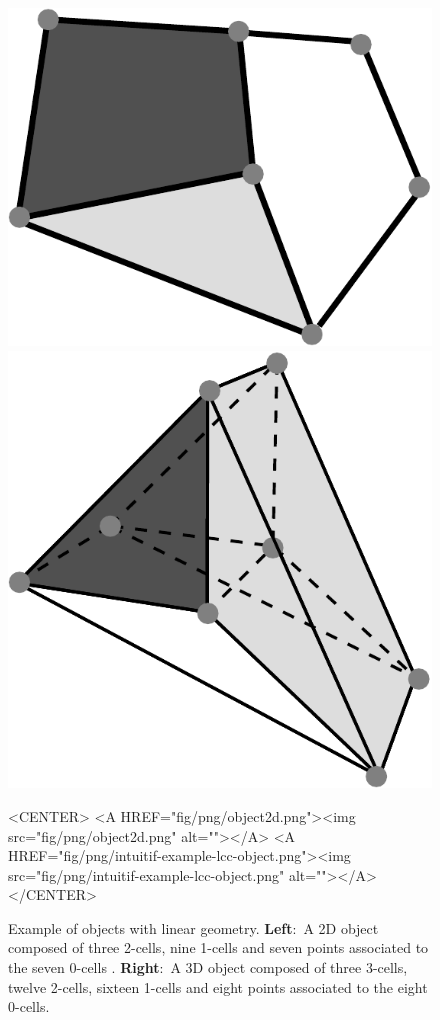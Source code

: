 \begin{figure}[ht]
  \begin{ccTexOnly}
    \begin{center}
      \includegraphics[width=.3\textwidth]
      {Linear_cell_complex/fig/pdf/object2d}
      \qquad
      \includegraphics[width=.53\textwidth]
      {Linear_cell_complex/fig/pdf/intuitif-example-lcc-object}
    \end{center}
  \end{ccTexOnly}
  \begin{ccHtmlOnly}
    <CENTER>
    <A HREF="fig/png/object2d.png"><img src="fig/png/object2d.png" alt=""></A>
    <A HREF="fig/png/intuitif-example-lcc-object.png"><img src="fig/png/intuitif-example-lcc-object.png" alt=""></A>
    </CENTER>
    \end{ccHtmlOnly}
    \caption{Example of objects with linear geometry. \textbf{Left}:~A
      2D object composed of three 2-cells, nine
      1-cells and seven points associated to the seven 0-cells .   
      \textbf{Right}:~A
      3D object composed of three 3-cells, twelve 2-cells, sixteen
      1-cells and eight points associated to the eight 0-cells.
      \label{fig-exemple-introductif}}
\end{figure}
%
